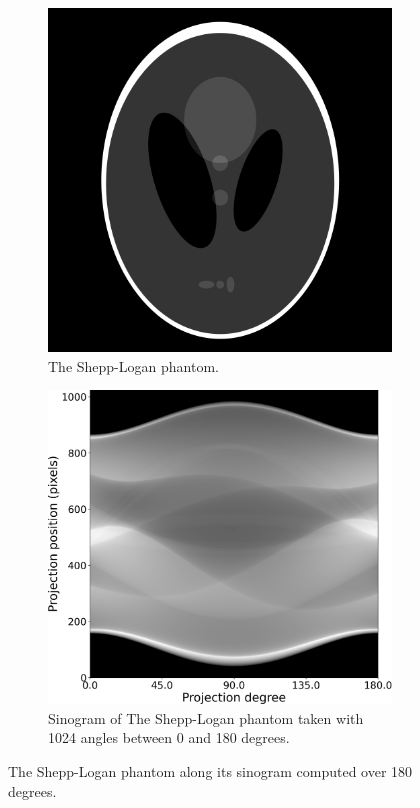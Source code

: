 \begin{figure}
	\centering
	\begin{subfigure}{0.48\linewidth}
		\centering
		\includegraphics[width=\linewidth]{Materials/sheppLogan}
		\caption{The Shepp-Logan phantom.\newline\newline}
		\label{shepp}
	\end{subfigure}
	\hfill
	\begin{subfigure}{0.48\linewidth}
			\centering
			\includegraphics[width=\linewidth]{Materials/sheppLoganHighRes}
			\caption{Sinogram of The Shepp-Logan phantom taken with 1024 angles between 0 and 180 degrees.}
			\label{sheppSinoHighRes}
	\end{subfigure}
	\caption{The Shepp-Logan phantom along its sinogram computed over 180 degrees.}
\end{figure}
